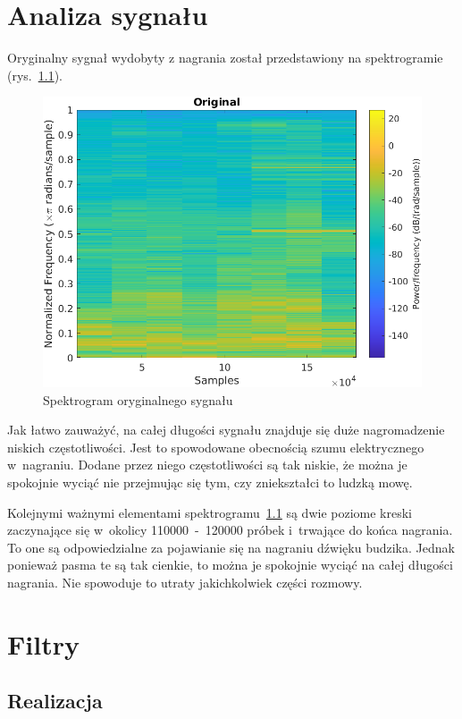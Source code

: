 \chapter{Analiza sygnału}
Oryginalny sygnał wydobyty z nagrania został przedstawiony na spektrogramie (rys.~\ref{original}).

\begin{figure}
\centering
\includegraphics{dane/original.png} %
\caption{Spektrogram oryginalnego sygnału}
\label{original}
\end{figure}

Jak łatwo zauważyć, na całej długości sygnału znajduje się duże nagromadzenie niskich częstotliwości.
Jest to spowodowane obecnością szumu elektrycznego w~nagraniu.
Dodane przez niego częstotliwości są tak niskie, że można je spokojnie wyciąć nie przejmując się tym, czy zniekształci to ludzką mowę.

Kolejnymi ważnymi elementami spektrogramu~\ref{original} są dwie poziome kreski zaczynające się w~okolicy \num{110000}~-~\num{120000} próbek i~trwające do końca nagrania.
To one są odpowiedzialne za pojawianie się na nagraniu dźwięku budzika.
Jednak ponieważ pasma te są tak cienkie, to można je spokojnie wyciąć na całej długości nagrania.
Nie spowoduje to utraty jakichkolwiek części rozmowy.

\chapter{Filtry}

\section{Realizacja}

